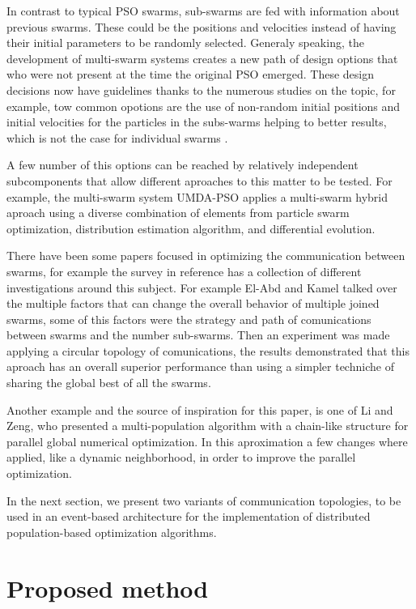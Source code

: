 \documentclass[runningheads]{llncs}
\begin{document}
In contrast to typical PSO swarms, sub-swarms are fed with information about
previous swarms. These could be the positions and velocities instead of having
their initial parameters to be randomly selected. Generaly speaking, the development of
multi-swarm systems creates a new path of design options that who were not present at the time the original PSO emerged. 
These design decisions now have guidelines thanks to the numerous studies on the topic, for
example, tow common opotions are the use of non-random initial positions and initial velocities for the particles in the subs-warms helping to
better results, which is not the case for individual swarms \cite{b9}.

A few number of this options can be reached by relatively independent
subcomponents that allow different aproaches to this matter to be
tested. For example, the multi-swarm system UMDA-PSO \cite{b10} 
applies a multi-swarm hybrid aproach using a diverse combination of 
elements from particle swarm optimization, distribution estimation 
algorithm, and differential evolution.

There have been some papers focused in optimizing the communication
between swarms, for example the survey in reference \cite{b15} has a
collection of different investigations around this subject. For
example El-Abd and Kamel talked over the multiple factors that can
change the overall behavior of multiple joined swarms, some of this factors
were the strategy and path of comunications between swarms and the number sub-swarms. 
Then an experiment was made applying a circular topology of comunications, 
the results demonstrated that this aproach has an overall superior performance 
than using a simpler techniche of sharing the global best of all the swarms\cite{b16}. 

Another example and the source of inspiration for this paper, is one
of Li and Zeng, who presented a multi-population algorithm with a chain-like structure for parallel global
numerical optimization. In this aproximation a few changes where applied, like a dynamic neighborhood,
in order to improve the parallel optimization\cite{b17}. 

In the next section, we present two variants of communication topologies,
to be used in an event-based architecture for the implementation of 
distributed population-based optimization algorithms.


\section{Proposed method}
\end{document}
